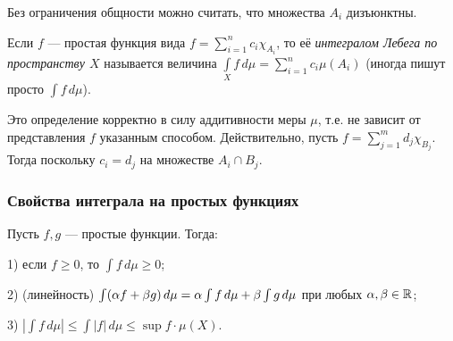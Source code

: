 \documentclass[10pt]{article}
\begin{document}
\begin{note}
Без ограничения общности можно считать, что множества $A_i$
дизъюнктны.
\end{note}

\begin{df}
Если $f$ --- простая функция вида $f=
\sum\limits_{i=1}^nc_i\chi_{A_i}$, то её \emph{интегралом Лебега по
пространству $X$} называется величина $\int\limits_X f\,
d\mu=\sum\limits_{i=1}^nc_i\mu(A_i)$ (иногда пишут просто $\int f\,
d\mu$).
\end{df}

\begin{note}
Это определение корректно в силу аддитивности меры $\mu$, т.е. не
зависит от представления $f$ указанным способом. Действительно,
пусть $f=\sum\limits_{j=1}^md_j\chi_{B_j}$. Тогда  поскольку $c_i=d_j$ на
множестве $A_i\cap B_j$.
\end{note}


\subsubsection{Свойства интеграла на простых функциях}

\begin{prop}
Пусть $f,g$ --- простые функции. Тогда:

1) если $f\ge0$, то $\int f\,d\mu\ge0$;

2) (линейность) $\int(\alpha f+\beta g)\,d\mu=\alpha\int f\,d\mu+\beta\int
g\,d\mu$ при любых $\alpha,\beta\in\mathbb{R}$;

3) $\left|\int f\,d\mu\right|\le\int|f|\,d\mu\le\sup f\cdot\mu(X)$.
\end{prop}
\end{document}
